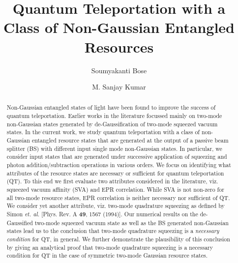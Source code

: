 \documentclass[letter,scriptaddress,twocolumn, prl,showkeys]{revtex4}
\begin{document}
\title {Quantum Teleportation with a Class of Non-Gaussian Entangled Resources}

\author{Soumyakanti Bose}
\author{M. Sanjay Kumar}


\begin{abstract}
Non-Gaussian entangled states of light have been found to improve the success of quantum teleportation. Earlier works in the literature focussed mainly on two-mode non-Gaussian states generated by de-Gaussification of two-mode squeezed vacuum states.
In the current work, we study quantum teleportation with a class of non-Gaussian entangled resource states that are generated at the output of a passive beam splitter (BS) with different input single mode non-Gaussian states. 
In particular, we consider input states that are generated under successive application of squeezing and photon addition/subtraction operations in various orders.
We focus on identifying what attributes of the resource states are necessary or sufficient for quantum teleportation (QT). 
To this end we first evaluate two attributes considered in the literature, viz. squeezed vacuum affinity (SVA) and EPR correlation.
While SVA is not non-zero for all two-mode resource states, EPR correlation is neither necessary nor sufficient of QT.
We consider yet another attribute, viz. two-mode quadrature squeezing as defined by Simon \emph{et. al.} [Phys. Rev. A \textbf{49}, 1567 (1994)].
Our numerical results on the de-Gaussified two-mode squeezed vacuum state as well as the BS generated non-Gaussian states lead us to the conclusion that two-mode quadrature squeezing is a {\it necessary condition} for QT, in general.
We further demonstrate the plausibility of this conclusion by giving an analytical proof that two-mode quadrature squeezing is a necessary condition for QT in the case of symmetric two-mode Gaussian resource states.
\end{abstract}

\end{document}
